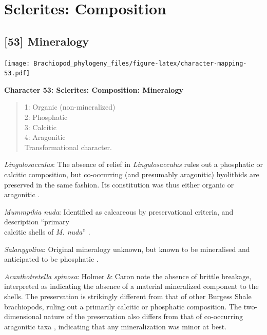 \documentclass[]{book}
\theoremstyle{definition}
\theoremstyle{definition}
\theoremstyle{definition}
\theoremstyle{remark}
\begin{document}
\hypertarget{sclerites-composition}{%
\section{Sclerites: Composition}\label{sclerites-composition}}

\hypertarget{mineralogy}{%
\subsection*{{[}53{]} Mineralogy}\label{mineralogy}}

\texttt{[image: Brachiopod\_phylogeny\_files/figure-latex/character-mapping-53.pdf]}

\textbf{Character 53: Sclerites: Composition: Mineralogy}

\begin{quote}
1: Organic (non-mineralized)\\
2: Phosphatic\\
3: Calcitic\\
4: Aragonitic\\
Transformational character.
\end{quote}

\emph{Lingulosacculus}: The absence of relief in \emph{Lingulosacculus}
rules out a phosphatic or calcitic composition, but co-occurring (and
presumably aragonitic) hyolithids are preserved in the same fashion. Its
constitution was thus either organic or aragonitic
\citep{Balthasar2009EarlyCambrian}.

\emph{Mummpikia nuda}: Identified as calcareous by preservational
criteria, and description ``primary\\
calcitic shells of \emph{M. nuda}'' \citep{Balthasar2008iMummpikia}.

\emph{Salanygolina}: Original mineralogy unknown, but known to be
mineralised and anticipated to be phosphatic
\citep{Holmer2009Theenigmatic}.

\emph{Acanthotretella spinosa}: Holmer \& Caron
\citeyearpar{Holmer2006Aspinose} note the absence of brittle breakage,
interpreted as indicating the absence of a material mineralized
component to the shells. The preservation is strikingly different from
that of other Burgess Shale brachiopods, ruling out a primarily calcitic
or phosphatic composition. The two-dimensional nature of the
preservation also differs from that of co-occurring aragonitic taxa
\citep[hyoliths;][ p.~273]{Holmer2006Aspinose}, indicating that any
mineralization was minor at best.
\end{document}

